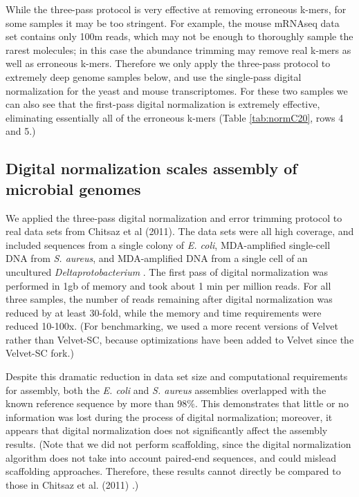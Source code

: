 \documentclass[10pt]{article}
\begin{document}
While the three-pass protocol is very effective at removing erroneous
k-mers, for some samples it may be too stringent.  For example, the
mouse mRNAseq data set contains only 100m reads, which may not be
enough to thoroughly sample the rarest molecules; in this case the
abundance trimming may remove real k-mers as well as erroneous k-mers.
Therefore we only apply the three-pass protocol to extremely deep
genome samples below, and use the single-pass digital normalization
for the yeast and mouse transcriptomes.  For these two samples we can
also see that the first-pass digital normalization is extremely effective,
eliminating essentially all of the erroneous k-mers (Table \ref{tab:normC20},
rows 4 and 5.)

\subsection*{Digital normalization scales assembly of microbial genomes}

We applied the three-pass digital normalization and error trimming
protocol to real data sets from Chitsaz et al (2011).  The data sets
were all high coverage, and included sequences from a single colony of
{\em E. coli}, MDA-amplified single-cell DNA from {\em S. aureus}, and
MDA-amplified DNA from a single cell of an uncultured {\em
  Deltaprotobacterium} \cite{pubmed21926975}.  The first pass of
digital normalization was performed in 1gb of memory and took about 1
min per million reads.  For all three samples, the number of reads
remaining after digital normalization was reduced by at least 30-fold,
while the memory and time requirements were reduced 10-100x.  (For
benchmarking, we used a more recent versions of Velvet rather than
Velvet-SC, because optimizations have been added to Velvet since the
Velvet-SC fork.)

Despite this dramatic reduction in data set size and computational
requirements for assembly, both the {\em E. coli} and {\em S. aureus}
assemblies overlapped with the known reference sequence by more than
98\%.  This demonstrates that little or no information was lost during
the process of digital normalization; moreover, it appears that
digital normalization does not significantly affect the assembly results.
(Note that we did not perform scaffolding, since the digital
normalization algorithm does not take into account paired-end
sequences, and could mislead scaffolding approaches.  Therefore, these
results cannot directly be compared to those in Chitsaz et al. (2011)
\cite{pubmed21926975}.)
\end{document}
